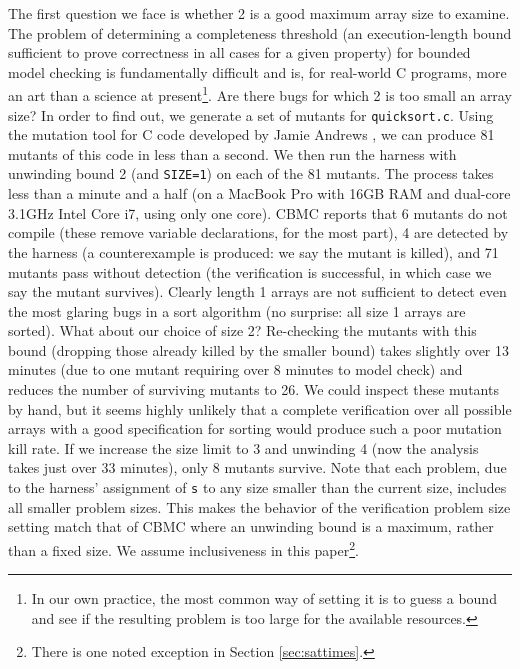 \documentclass{svjour3}
\begin{document}
The first question we face is whether 2 is a good maximum array
size to examine.  The problem of determining a completeness
  threshold (an execution-length bound sufficient to prove correctness
in all cases for a given property) for bounded model checking is
fundamentally difficult \cite{CTDaniel} and is, for real-world C
programs, more an art than a science at present\footnote{In our own
  practice, the most common way of setting it is to guess a bound and
  see if the resulting problem is too large for the available
  resources.}.  Are there bugs for which 2 is too small
an array size?  In order to find out, we generate a set of mutants for
{\tt quicksort.c}.  Using the mutation tool for C code developed by
Jamie Andrews \cite{mutant}, we can produce 81 mutants of this code in
less than a second.  We then run the harness with unwinding bound 2
(and {\tt SIZE=1}) on each of the 81 mutants.  The process takes less
than a minute and a half (on a MacBook Pro with 16GB RAM and dual-core 3.1GHz Intel
Core i7, using only one core).  CBMC reports that 6 mutants do not
compile (these remove variable declarations, for the most part), 4 are
detected by the harness (a counterexample is produced: we say the
mutant is killed), and 71 mutants pass without detection (the
verification is successful, in which case we say the mutant survives).
Clearly length 1 arrays are not sufficient to detect even the most
glaring bugs in a sort algorithm (no surprise: all size 1 arrays are
sorted).  What about our choice of size 2?  Re-checking the mutants
with this bound
(dropping those already killed by the smaller bound) takes slightly
over 13 minutes (due to one mutant requiring over 8 minutes
to model check) and reduces the number of surviving mutants to 26.  We
could inspect these mutants by hand, but it seems highly unlikely that
a complete verification over all possible arrays with a good
specification for sorting would produce such a poor mutation kill rate.
If we increase the size limit to 3 and unwinding 4 (now the analysis takes just over 33
minutes), only 8 mutants survive.  Note that each problem, due to the
harness' assignment of {\tt s} to any size smaller than the current
size, includes all smaller problem sizes. This makes the behavior of
the verification problem size setting match that of CBMC where an unwinding bound is a maximum, rather than
a fixed size.  We assume inclusiveness in this paper\footnote{There is
  one noted exception in Section \ref{sec:sattimes}.}.
\end{document}

